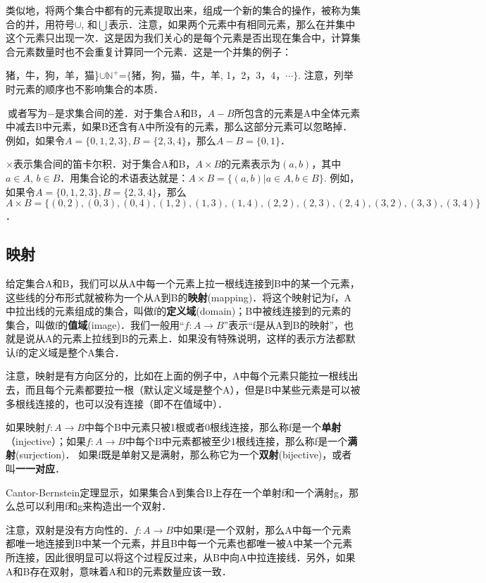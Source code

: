 类似地，将两个集合中都有的元素提取出来，组成一个新的集合的操作，被称为集合的并，用符号$\cup$, 和$\bigcup$表示．注意，如果两个元素中有相同元素，那么在并集中这个元素只出现一次．这是因为我们关心的是每个元素是否出现在集合中，计算集合元素数量时也不会重复计算同一个元素．这是一个并集的例子：{猪，牛，狗，羊，猫\}$\cup\mathbb{N^+}$=$\{$猪，狗，猫，牛，羊, 1，2，3，4，$\cdots\}$. 注意，列举时元素的顺序也不影响集合的本质．

$\ $或者写为$-$是求集合间的差．对于集合A和B，$A-B$所包含的元素是A中全体元素中减去B中元素，如果B还含有A中所没有的元素，那么这部分元素可以忽略掉．例如，如果令$A=\{0,1,2,3\}, B=\{2,3,4\}$，那么$A-B=\{0,1\}$．

$\times$表示集合间的笛卡尔积．对于集合A和B，$A\times B$的元素表示为$(a,b)$，其中$a\in A$, $b\in B$．用集合论的术语表达就是：$A\times B=\{(a,b)|a\in A, b\in B\}$. 例如，如果令$A=\{0,1,2,3\}, B=\{2,3,4\}$，那么$A\times B=\{ (0,2),(0,3),(0,4),(1,2),(1,3),(1,4),(2,2),(2,3),(2,4),(3,2),(3,3),(3,4) \}$．



\subsection{映射}


给定集合A和B，我们可以从A中每一个元素上拉一根线连接到B中的某一个元素，这些线的分布形式就被称为一个从A到B的\textbf{映射}(mapping)．将这个映射记为f，A中拉出线的元素组成的集合，叫做f的\textbf{定义域}(domain)；B中被线连接到的元素的集合，叫做f的\textbf{值域}(image)．我们一般用“$f:A\rightarrow B$”表示“f是从A到B的映射”，也就是说从A的元素上拉线到B的元素上．如果没有特殊说明，这样的表示方法都默认f的定义域是整个A集合．

注意，映射是有方向区分的，比如在上面的例子中，A中每个元素只能拉一根线出去，而且每个元素都要拉一根（默认定义域是整个A），但是B中某些元素是可以被多根线连接的，也可以没有连接（即不在值域中）．

如果映射$f:A\rightarrow B$中每个B中元素只被1根或者0根线连接，那么称f是一个\textbf{单射}（injective）；如果$f:A\rightarrow B$中每个B中元素都被至少1根线连接，那么称f是一个\textbf{满射}(surjection)． 如果f既是单射又是满射，那么称它为一个\textbf{双射}(bijective)，或者叫\textbf{一一对应}．

Cantor-Bernstein定理显示，如果集合A到集合B上存在一个单射f和一个满射g，那么总可以利用f和g来构造出一个双射．

注意，双射是没有方向性的．$f:A\rightarrow B$中如果f是一个双射，那么A中每一个元素都唯一地连接到B中某一个元素，并且B中每一个元素也都唯一被A中某一个元素所连接，因此很明显可以将这个过程反过来，从B中向A中拉连接线．另外，如果A和B存在双射，意味着A和B的元素数量应该一致．

}
